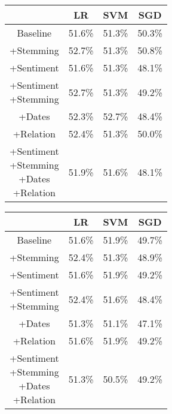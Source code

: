 \documentclass[11pt,a4paper]{article}
\begin{document}
\newpage
\begin{center}
\begin{tabular}{ |c|c|c|c| }
 \hline
  & LR & SVM & SGD \\
  \hline
  Baseline & 51.6\% & 51.3\% & 50.3\% \\
  \hline
 +Stemming & 52.7\% & 51.3\% & 50.8\% \\
  \hline
 +Sentiment & 51.6\% & 51.3\% & 48.1\% \\
  \hline
  \shortstack{+Sentiment \\ +Stemming} & 52.7\% & 51.3\% & 49.2\%\\
 \hline
 +Dates & 52.3\% & 52.7\% & 48.4\% \\
  \hline
 +Relation & 52.4\% & 51.3\% & 50.0\% \\
  \hline
  \shortstack{+Sentiment \\ +Stemming \\+Dates \\+Relation} & 51.9\% & 51.6\% & 48.1\% \\
 \hline
\end{tabular}
\end{center}

\begin{center}
\begin{tabular}{ |c|c|c|c| }
 \hline
  & LR & SVM & SGD \\
  \hline
  Baseline & 51.6\% & 51.9\% & 49.7\% \\
  \hline
 +Stemming & 52.4\% & 51.3\% & 48.9\% \\
  \hline
 +Sentiment & 51.6\% & 51.9\% & 49.2\% \\
  \hline
  \shortstack{+Sentiment \\ +Stemming} & 52.4\% & 51.6\% & 48.4\%\\
 \hline
 +Dates & 51.3\% & 51.1\% & 47.1\% \\
  \hline
 +Relation & 51.6\% & 51.9\% & 49.2\% \\
  \hline
  \shortstack{+Sentiment \\ +Stemming \\+Dates \\+Relation} & 51.3\% & 50.5\% & 49.2\% \\
 \hline
\end{tabular}
\end{center}
\end{document}
